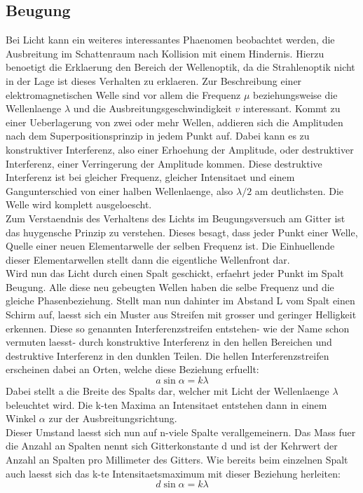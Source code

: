 \subsection{Beugung}
Bei Licht kann ein weiteres interessantes Phaenomen beobachtet werden, die Ausbreitung im Schattenraum nach Kollision mit einem Hindernis. Hierzu benoetigt die Erklaerung den Bereich der Wellenoptik, da die Strahlenoptik nicht in der Lage ist dieses Verhalten zu erklaeren. Zur Beschreibung einer elektromagnetischen Welle sind vor allem die Frequenz $\mu$ beziehungsweise die Wellenlaenge $\lambda$ und die Ausbreitungsgeschwindigkeit $v$ interessant. Kommt zu einer Ueberlagerung von zwei oder mehr Wellen, addieren sich die Amplituden nach dem Superpositionsprinzip in jedem Punkt auf. Dabei kann es zu konstruktiver Interferenz, also einer Erhoehung der Amplitude, oder destruktiver Interferenz, einer Verringerung der Amplitude kommen. Diese destruktive Interferenz ist bei gleicher Frequenz, gleicher Intensitaet und einem Gangunterschied von einer halben Wellenlaenge, also $\lambda/2$ am deutlichsten. Die Welle wird komplett ausgeloescht.\\
Zum Verstaendnis des Verhaltens des Lichts im Beugungsversuch am Gitter ist das huygensche Prinzip zu verstehen. Dieses besagt, dass jeder Punkt einer Welle, Quelle einer neuen Elementarwelle der selben Frequenz ist. Die Einhuellende dieser Elementarwellen stellt dann die eigentliche Wellenfront dar.\\
Wird nun das Licht durch einen Spalt geschickt, erfaehrt jeder Punkt im Spalt Beugung. Alle diese neu gebeugten Wellen haben die selbe Frequenz und die gleiche Phasenbeziehung. Stellt man nun dahinter im Abstand L vom Spalt einen Schirm auf, laesst sich ein Muster aus Streifen mit grosser und geringer Helligkeit erkennen. Diese so genannten Interferenzstreifen entstehen- wie der Name schon vermuten laesst- durch konstruktive Interferenz in den hellen Bereichen und destruktive Interferenz in den dunklen Teilen. Die hellen Interferenzstreifen erscheinen dabei an Orten, welche diese Beziehung erfuellt:
\begin{equation}
    a \sin\alpha=k\lambda
\end{equation}
Dabei stellt a die Breite des Spalts dar, welcher mit Licht der Wellenlaenge $\lambda$ beleuchtet wird. Die k-ten Maxima an Intensitaet entstehen dann in einem Winkel $\alpha$ zur der Ausbreitungsrichtung.\\
Dieser Umstand laesst sich nun auf n-viele Spalte verallgemeinern. Das Mass fuer die Anzahl an Spalten nennt sich Gitterkonstante d und ist der Kehrwert der Anzahl an Spalten pro Millimeter des Gitters. Wie bereits beim einzelnen Spalt auch laesst sich das k-te Intensitaetsmaximum mit dieser Beziehung herleiten:
\begin{equation}
    d\sin\alpha=k\lambda
\end{equation}
